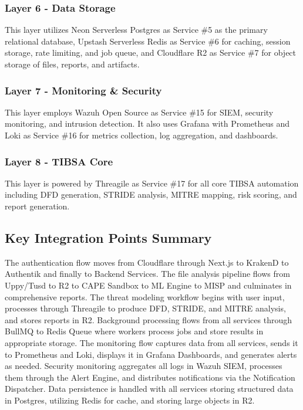 \documentclass[12pt,a4paper]{report}
\begin{document}
\subsubsection{Layer 6 - Data Storage}

This layer utilizes Neon Serverless Postgres as Service \#5 as the primary relational database, Upstash Serverless Redis as Service \#6 for caching, session storage, rate limiting, and job queue, and Cloudflare R2 as Service \#7 for object storage of files, reports, and artifacts.

\subsubsection{Layer 7 - Monitoring \& Security}

This layer employs Wazuh Open Source as Service \#15 for SIEM, security monitoring, and intrusion detection. It also uses Grafana with Prometheus and Loki as Service \#16 for metrics collection, log aggregation, and dashboards.

\subsubsection{Layer 8 - TIBSA Core}

This layer is powered by Threagile as Service \#17 for all core TIBSA automation including DFD generation, STRIDE analysis, MITRE mapping, risk scoring, and report generation.

\subsection{Key Integration Points Summary}

The authentication flow moves from Cloudflare through Next.js to KrakenD to Authentik and finally to Backend Services. The file analysis pipeline flows from Uppy/Tusd to R2 to CAPE Sandbox to ML Engine to MISP and culminates in comprehensive reports. The threat modeling workflow begins with user input, processes through Threagile to produce DFD, STRIDE, and MITRE analysis, and stores reports in R2. Background processing flows from all services through BullMQ to Redis Queue where workers process jobs and store results in appropriate storage. The monitoring flow captures data from all services, sends it to Prometheus and Loki, displays it in Grafana Dashboards, and generates alerts as needed. Security monitoring aggregates all logs in Wazuh SIEM, processes them through the Alert Engine, and distributes notifications via the Notification Dispatcher. Data persistence is handled with all services storing structured data in Postgres, utilizing Redis for cache, and storing large objects in R2.
\end{document}
